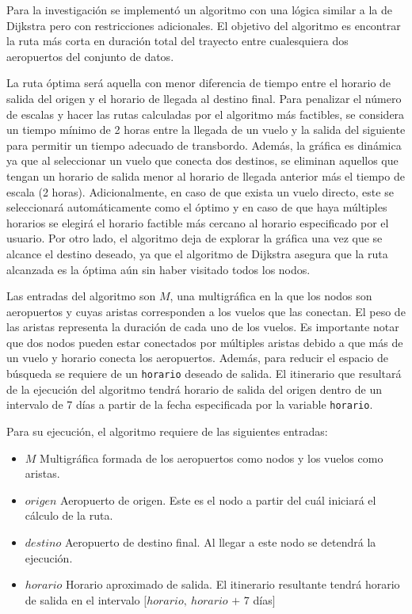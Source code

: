 Para la investigación se implementó un algoritmo con una lógica similar a la de Dijkstra pero con restricciones adicionales. El objetivo del algoritmo es encontrar la ruta más corta en duración total del trayecto entre cualesquiera dos aeropuertos del conjunto de datos.

La ruta óptima será aquella con menor diferencia de tiempo entre el horario de salida del origen y el horario de llegada al destino final. Para penalizar el número de escalas y hacer las rutas calculadas por el algoritmo más factibles, se considera un tiempo mínimo de 2 horas entre la llegada de un vuelo y la salida del siguiente para permitir un tiempo adecuado de transbordo. Además, la gráfica es dinámica ya que al seleccionar un vuelo que conecta dos destinos, se eliminan aquellos que tengan un horario de salida menor al horario de llegada anterior más el tiempo de escala (2 horas). Adicionalmente, en caso de que exista un vuelo directo, este se seleccionará automáticamente como el óptimo y en caso de que haya múltiples horarios se elegirá el horario factible más cercano al horario especificado por el usuario. Por otro lado, el algoritmo deja de explorar la gráfica una vez que se alcance el destino deseado, ya que el algoritmo de Dijkstra asegura que la ruta alcanzada es la óptima aún sin haber visitado todos los nodos.

Las entradas del algoritmo son $M$, una multigráfica en la que los nodos son aeropuertos y cuyas aristas corresponden a los vuelos que las conectan. El peso de las aristas representa la duración de cada uno de los vuelos. Es importante notar que dos nodos pueden estar conectados por múltiples aristas debido a que más de un vuelo y horario conecta los aeropuertos. Además, para reducir el espacio de búsqueda se requiere de un \texttt{horario} deseado de salida. El itinerario que resultará de la ejecución del algoritmo tendrá horario de salida del origen dentro de un intervalo de 7 días a partir de la fecha especificada por la variable \texttt{horario}.

Para su ejecución, el algoritmo requiere de las siguientes entradas:

\begin{itemize}
	\item $M$ Multigráfica formada de los aeropuertos como nodos y los vuelos como aristas.
	\item $origen$ Aeropuerto de origen. Este es el nodo a partir del cuál iniciará el cálculo de la ruta.
	\item $destino$ Aeropuerto de destino final. Al llegar a este nodo se detendrá la ejecución.
	\item $horario$ Horario aproximado de salida. El itinerario resultante tendrá horario de salida en el intervalo $[horario,\  horario$ $+$ 7 días$]$
\end{itemize}

